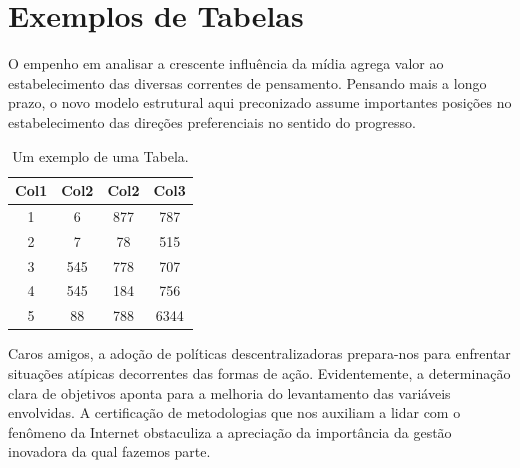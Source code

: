 \documentclass[fleqn]{icat-ufal}
\begin{document}
\chapter{Exemplos de Tabelas}
\label{cap:exemplos_de_tabelas}

O empenho em analisar a crescente influência da mídia agrega valor ao
estabelecimento das diversas correntes de pensamento. Pensando mais a longo
prazo, o novo modelo estrutural aqui preconizado assume importantes posições no
estabelecimento das direções preferenciais no sentido do progresso. 

\begin{table}
  \begin{center}
    \caption{Um exemplo de uma Tabela.}
    \label{tab:exemplo_tabela}
    \begin{tabular}{||c c c c||}
      \hline
      Col1 & Col2 & Col2 & Col3 \\[0.5ex] \hline\hline
       1   & 6    & 877  & 787  \\ \hline
       2   & 7    & 78   & 515  \\ \hline
       3   & 545  & 778  & 707  \\ \hline
       4   & 545  & 184  & 756  \\ \hline
       5   & 88   & 788  & 6344 \\[1ex] \hline
    \end{tabular}
  \end{center}
\end{table}

Caros amigos, a adoção de políticas descentralizadoras prepara-nos para enfrentar
situações atípicas decorrentes das formas de ação. Evidentemente, a determinação
clara de objetivos aponta para a melhoria do levantamento das variáveis
envolvidas. A certificação de metodologias que nos auxiliam a lidar com o
fenômeno da Internet obstaculiza a apreciação da importância da gestão inovadora
da qual fazemos parte. 
\end{document}
